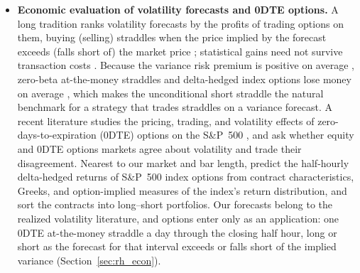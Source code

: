 \begin{itemize}
  We ask what such data add to a pooled intraday model of the index's realized variance, next to the futures' own
  realized moments, the trading of the index's constituents, implied volatility, and the FOMC calendar.
\item \textbf{Economic evaluation of volatility forecasts and 0DTE options.} A long tradition ranks volatility
  forecasts by the profits of trading options on them, buying (selling) straddles when the price implied by the
  forecast exceeds (falls short of) the market price \citep{EngleHongKaneNoh1993,NohEngleKane1994,
  BandiRussellYang2008}; statistical gains need not survive transaction costs
  \citep{HarveyWhaley1992,ChanJhaKalimipalli2009}. Because the variance risk premium is positive on average
  \citep{CarrWu2009,BollerslevTauchenZhou2009}, zero-beta at-the-money straddles and delta-hedged index options lose
  money on average \citep{CovalShumway2001,BakshiKapadia2003}, which makes the unconditional short straddle the
  natural benchmark for a strategy that trades straddles on a variance forecast. A recent literature studies the
  pricing, trading, and volatility effects of zero-days-to-expiration (0DTE) options on the S\&P~500
  \citep{BandiFusariReno2023,BeckmeyerBrangerGayda2023,DimErakerVilkov2024}, and \citet{ChongTodorov2026} ask
  whether equity and 0DTE options markets agree about volatility and trade their disagreement. Nearest to our market
  and bar length, \citet{MaischZhangUlrichZimmer2026} predict the half-hourly delta-hedged returns of S\&P~500 index
  options from contract characteristics, Greeks, and option-implied measures of the index's return distribution,
  and sort the contracts into long--short portfolios. Our forecasts belong to the realized volatility literature,
  and options enter only as an application: one 0DTE at-the-money straddle a day through the closing half hour,
  long or short as the forecast for that interval exceeds or falls short of the implied variance
  (Section~\ref{sec:rh_econ}).
\end{itemize}

